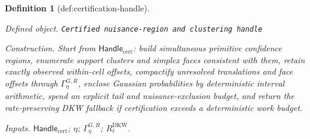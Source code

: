 \documentclass{article}
\newtheorem{definition}{Definition}
\begin{document}
\begin{definition}[def:certification-handle]\label{def:certification-handle}
\par\smallskip\noindent\emph{Defined object.} \texttt{Certified nuisance-\allowbreak{}region and clustering handle}
\par\smallskip\noindent\emph{Construction.} Start from \(\mathsf{Handle}_{\mathrm{cert}}\): build simultaneous primitive confidence regions, enumerate support clusters and simplex faces consistent with them, retain exactly observed within-cell offsets, compactify unresolved translations and face offsets through \(\Gamma_\eta^{G,R}\), enclose Gaussian probabilities by deterministic interval arithmetic, spend an explicit tail and nuisance-exclusion budget, and return the rate-preserving DKW fallback if certification exceeds a deterministic work budget.
\par\smallskip\noindent\emph{Inputs.} \(\mathsf{Handle}_{\mathrm{cert}}\); \(\eta\); \(\Gamma_\eta^{G,R}\); \(R^{\mathrm{DKW}}_\ell\).
\end{definition}
\end{document}

